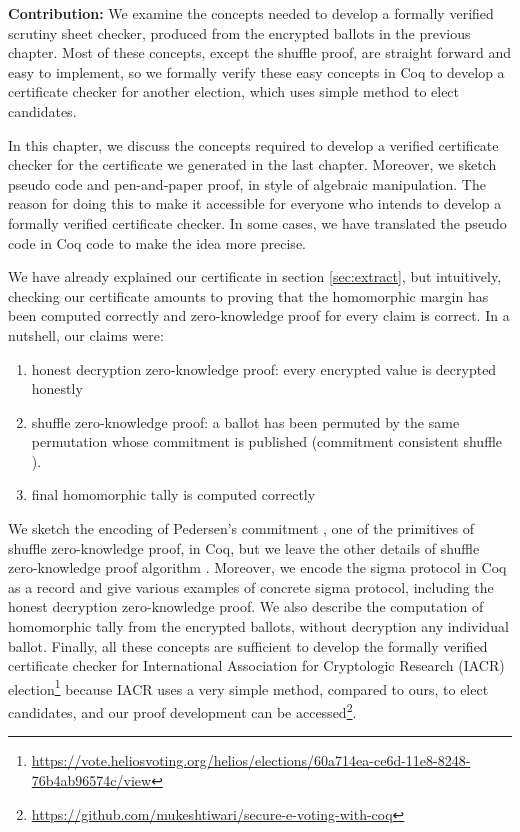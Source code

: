 \textbf{Contribution:} We examine the concepts needed to develop a formally 
verified scrutiny sheet checker,  produced from the encrypted ballots in the previous chapter. 
Most of these concepts, except the shuffle proof, are straight forward and easy to implement,  so
we formally verify these easy concepts in Coq to develop a certificate 
checker for another election, which uses simple method to elect candidates. 

In this chapter, we discuss the concepts required to develop a verified certificate checker for the certificate we generated 
in the last chapter.  Moreover, we sketch pseudo code and pen-and-paper proof, in style of algebraic manipulation.  
 The reason for doing this to make
it accessible for everyone who intends to develop a formally verified certificate checker.  
In some cases, we have translated the pseudo code in Coq code to make the idea more precise. 


We have already explained our certificate in section \ref{sec:extract}, 
but intuitively,  checking our certificate amounts to proving that  the homomorphic margin has been 
computed correctly and zero-knowledge proof for every claim is correct. In a nutshell, 
our claims were:
\begin{enumerate}
\item honest decryption zero-knowledge proof: every encrypted value is decrypted honestly 
\item shuffle zero-knowledge proof:
  a ballot has been permuted by the same permutation whose commitment is published (commitment consistent shuffle \citep{Wikstrom:2009:CPS}).
\item final homomorphic tally is computed correctly
\end{enumerate}


\noindent
We sketch the encoding of Pedersen's commitment \citep{Pederson}, one of the primitives of shuffle zero-knowledge proof, in Coq, 
but we leave the other details of shuffle zero-knowledge proof algorithm \citep{Wikstrom:2009:CPS}. Moreover, we
encode the sigma protocol in Coq as a record and give various examples of concrete sigma protocol, including 
the honest decryption zero-knowledge proof.   We also describe the computation of homomorphic tally from the encrypted 
ballots, without decryption any individual ballot.  Finally, all 
these concepts are sufficient to develop the formally verified 
certificate checker for International Association for Cryptologic Research (IACR) election\footnote{\url{https://vote.heliosvoting.org/helios/elections/60a714ea-ce6d-11e8-8248-76b4ab96574c/view}}
because IACR uses a very simple method, compared to ours, to elect candidates,  
and our proof development can be accessed\footnote{\url{https://github.com/mukeshtiwari/secure-e-voting-with-coq}}. 

